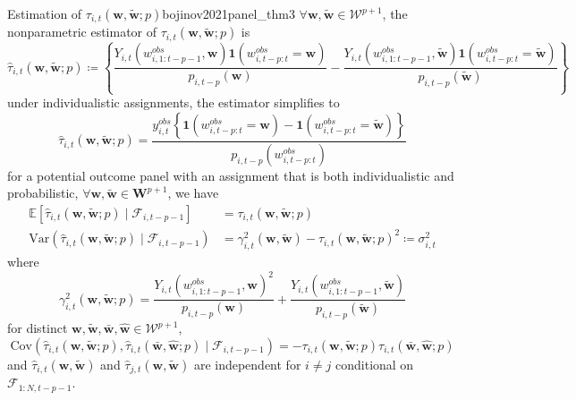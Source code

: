 \documentclass[twoside]{article}
\begin{document}
\begin{theorem}{Estimation of $\tau_{i,t}\left(\mathbf{w},\tilde{\mathbf{w}};p\right)$}{bojinov2021panel_thm3}
    $\forall \mathbf{w},\tilde{\mathbf{w}}\in\mathcal{W}^{p+1}$, the nonparametric estimator of $\tau_{i,t}\left(\mathbf{w},\tilde{\mathbf{w}};p\right)$ is 
    \begin{equation*}
        \hat{\tau}_{i,t}\left(\mathbf{w},\tilde{\mathbf{w}};p\right) \coloneq \left\{ \frac{Y_{i,t}\left(w^{obs}_{i,1:t-p-1},\mathbf{w}\right)\mathbf{1}\left(w^{obs}_{i,t-p:t}=\mathbf{w}\right)}{p_{i,t-p}(\mathbf{w})} - \frac{Y_{i,t}\left(w^{obs}_{i,1:t-p-1},\tilde{\mathbf{w}}\right)\mathbf{1}\left(w^{obs}_{i,t-p:t}=\tilde{\mathbf{w}}\right)}{p_{i,t-p}(\tilde{\mathbf{w}})} \right\}
    \end{equation*}
    under individualistic assignments, the estimator simplifies to $$ \hat{\tau}_{i,t}\left(\mathbf{w},\tilde{\mathbf{w}};p\right) = \frac{y^{obs}_{i,t}\left\{\mathbf{1}\left(w^{obs}_{i,t-p:t}=\mathbf{w}\right) - \mathbf{1}\left(w^{obs}_{i,t-p:t}=\tilde{\mathbf{w}}\right) \right\}}{p_{i,t-p}\left(w^{obs}_{i,t-p:t}\right)} $$
    for a potential outcome panel with an assignment that is both individualistic and probabilistic, $\forall \mathbf{w},\tilde{\mathbf{w}}\in\mathbf{W}^{p+1}$, we have 
    \begin{align*}
        \mathbb{E}\left[\hat{\tau}_{i,t}\left(\mathbf{w},\tilde{\mathbf{w}};p\right)\mid \mathcal{F}_{i,t-p-1}\right] &= \tau_{i,t}\left(\mathbf{w},\tilde{\mathbf{w}};p\right)\\
        \mathrm{Var}\left(\hat{\tau}_{i,t}\left(\mathbf{w},\tilde{\mathbf{w}};p\right)\mid \mathcal{F}_{i,t-p-1}\right) &= \gamma^2_{i,t}\left(\mathbf{w},\tilde{\mathbf{w}}\right) - \tau_{i,t}\left(\mathbf{w},\tilde{\mathbf{w}};p\right)^2 \coloneq \sigma^2_{i,t}
    \end{align*}
    where $$ \gamma^2_{i,t}\left(\mathbf{w},\tilde{\mathbf{w}};p\right) = \frac{Y_{i,t}\left(w^{obs}_{i,1:t-p-1},\mathbf{w}\right)^2}{p_{i,t-p}(\mathbf{w})} + \frac{Y_{i,t}\left(w^{obs}_{i,1:t-p-1},\tilde{\mathbf{w}}\right)}{p_{i,t-p}\left(\tilde{\mathbf{w}}\right)} $$
    for distinct $\mathbf{w},\tilde{\mathbf{w}},\bar{\mathbf{w}},\hat{\mathbf{w}}\in\mathcal{W}^{p+1}$, $$ \mathrm{Cov}\left(\hat{\tau}_{i,t}\left(\mathbf{w},\tilde{\mathbf{w}};p\right), \hat{\tau}_{i,t}\left(\bar{\mathbf{w}},\hat{\mathbf{w}};p\right) \mid \mathcal{F}_{i,t-p-1}\right) = -\tau_{i,t}\left(\mathbf{w},\tilde{\mathbf{w}};p\right) \tau_{i,t}\left(\bar{\mathbf{w}},\hat{\mathbf{w}};p\right) $$
    and $\hat{\tau}_{i,t}\left(\mathbf{w},\tilde{\mathbf{w}}\right)$ and $\hat{\tau}_{j,t}\left(\mathbf{w},\tilde{\mathbf{w}}\right)$ are independent for $i\neq j$ conditional on $\mathcal{F}_{1:N,t-p-1}$.
\end{theorem}
\end{document}
